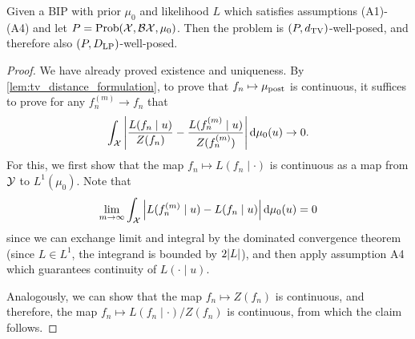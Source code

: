 \begin{theorem}
	Given a BIP with prior $\mu_0$ and likelihood $L$ which satisfies assumptions (A1)-(A4) and let $P = \operatorname{Prob}(\mathcal X, \mathcal B\mathcal X, \mu_0)$. Then the problem is $(P, d_\mathrm{TV})$-well-posed, and therefore also $(P, D_\mathrm{LP})$-well-posed. 
\end{theorem}

\begin{proof}
	We have already proved existence and uniqueness. By \cref{lem:tv_distance_formulation}, to prove that $f_n \mapsto \mu_\mathrm{post}$ is continuous, it suffices to prove for any $f_n^{(m)} \to f_n$ that
	\[
	\int_\mathcal X \abs{\frac{L(f_n \mid u)}{Z(f_n)} - \frac{L(f_n^{(m)} \mid u)}{Z(f_n^{(m)})}} \dd{\mu_0(u)} \to 0.
	\]
	For this, we first show that the map $f_n \mapsto L(f_n \mid \cdot)$ is continuous as a map from $\mathcal Y$ to $L^1(\mu_0)$. Note that
	\[
	\lim_{m\to\infty} \int_\mathcal X \abs{L(f_n^{(m)} \mid u) - L(f_n \mid u)} \dd{\mu_0(u)} = 0
	\]
	since we can exchange limit and integral by the dominated convergence theorem (since $L \in L^1$, the integrand is bounded by $2\abs{L}$), and then apply assumption A4 which guarantees continuity of $L(\cdot \mid u)$. 
	
	Analogously, we can show that the map $f_n \mapsto Z(f_n)$ is continuous, and therefore, the map $f_n \mapsto L(f_n \mid \cdot) / Z(f_n)$ is continuous, from which the claim follows. 
\end{proof}